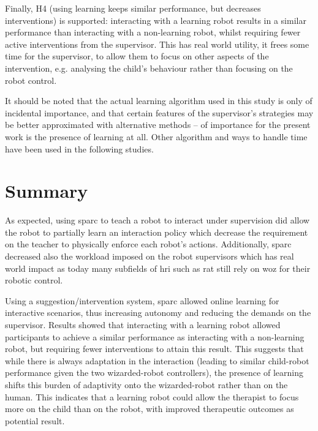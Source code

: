 Finally, H4 (using learning keeps similar performance, but decreases interventions) is supported: interacting with a learning robot results in a similar performance than interacting with a non-learning robot, whilst requiring fewer active interventions from the supervisor. This has real world utility, it frees some time for the supervisor, to allow them to focus on other aspects of the intervention, e.g. analysing the child's behaviour rather than focusing on the robot control. 

It should be noted that the actual learning algorithm used in this study is only of incidental importance, and that certain features of the supervisor's strategies may be better approximated with alternative methods -- of importance for the present work is the presence of learning at all. Other algorithm and ways to handle time have been used in the following studies.

\section{Summary}

As expected, using \gls{sparc} to teach a robot to interact under supervision did allow the robot to partially learn an interaction policy which decrease the requirement on the teacher to physically enforce each robot's actions. Additionally, \gls{sparc} decreased also the workload imposed on the robot supervisors which has real world impact as today many subfields of \gls{hri} such as \gls{rat} still rely on \gls{woz} for their robotic control.

Using a suggestion/intervention system, \gls{sparc} allowed online learning for interactive scenarios, thus increasing autonomy and reducing the demands on the supervisor. Results showed that interacting with a learning robot allowed participants to achieve a similar performance as interacting with a non-learning robot, but requiring fewer interventions to attain this result. This suggests that while there is always adaptation in the interaction (leading to similar child-robot performance given the two wizarded-robot controllers), the presence of learning shifts this burden of adaptivity onto the wizarded-robot rather than on the human. This indicates that a learning robot could allow the therapist to focus more on the child than on the robot, with improved therapeutic outcomes as potential result. 

